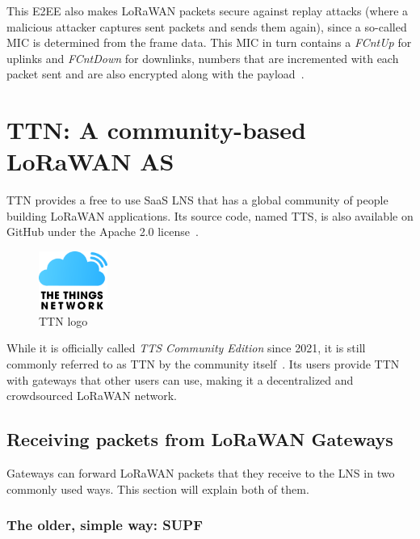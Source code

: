 This \ac{E2EE} also makes \ac{LoRaWAN} packets secure against replay attacks (where a malicious attacker captures sent packets and sends them again), since a so-called \ac{MIC} is determined from the frame data.
This \ac{MIC} in turn contains a \emph{FCntUp} for uplinks and \emph{FCntDown} for downlinks, numbers that are incremented with each packet sent and are also encrypted along with the payload~\cite[p. 22f.]{lora_alliance_inc_lorawan_specification_2017}.

\section{\acl{TTN}: A community-based \acs{LoRaWAN} \acl{AS}}

\ac{TTN} provides a free to use \ac{SaaS} \ac{LNS} that has a global community of people building \ac{LoRaWAN} applications.
Its source code, named \ac{TTS}, is also available on GitHub under the Apache 2.0 license~\cite{the_things_network_thethingsnetworklorawan-stack_2023}.

\begin{figure}[htbp]
    \centering
    \includegraphics[width=0.2\textwidth]{pictures/logos/TTN-logo.eps}
    \caption{\acf{TTN} logo~\protect\cite{the_things_industries_bv_quick_nodate}}
\end{figure}


While it is officially called \emph{\acl{TTS} Community Edition} since 2021, it is still commonly referred to as \acf{TTN} by the community itself~\cite{the_things_industries_bv_what_2022}.
Its users provide \ac{TTN} with gateways that other users can use, making it a decentralized and crowdsourced \ac{LoRaWAN} network.

\subsection{Receiving packets from \acs{LoRaWAN} Gateways}

Gateways can forward \ac{LoRaWAN} packets that they receive to the \ac{LNS} in two commonly used ways.
This section will explain both of them.

\subsubsection{The older, simple way: \acl{SUPF}}

